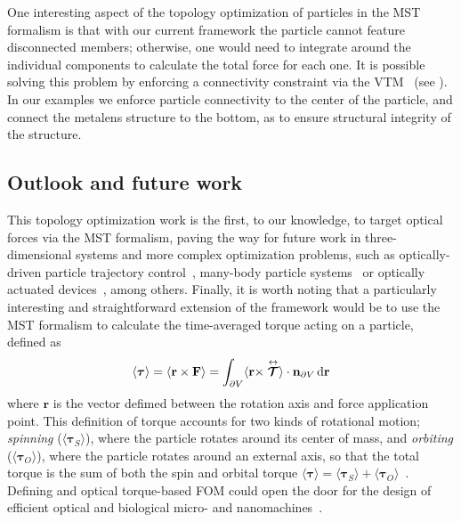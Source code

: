 One interesting aspect of the topology optimization of particles in the MST formalism is that with our current framework the particle cannot feature disconnected members; otherwise,
one would need to integrate around the individual components to calculate the total force for each one. It is possible solving this problem by enforcing 
a connectivity constraint via the VTM~\cite{li_structural_2016} (see ). In our examples
we enforce particle connectivity to the center of the particle, and connect the metalens structure to the bottom, as to ensure structural
integrity of the structure.

\subsection*{Outlook and future work}

This topology optimization work is the first, to our knowledge, to 
target optical forces via the MST formalism, paving the way for future work in three-dimensional systems and more complex optimization problems, such as optically-driven particle
trajectory control~\cite{zemanek_perspective_2019, macdonald_microfluidic_2003, shilkin_directional_2017}, many-body particle systems~\cite{bechinger_active_2016, chang_colloquium_2018} or optically actuated devices~\cite{ivanyi_optically_2024}, among others.
Finally, it is worth noting that a particularly interesting and straightforward extension of the framework would be to use the MST formalism to calculate the time-averaged torque acting on a particle, defined as~\cite{novotny}
\begin{equation}
    \langle \bm{\tau} \rangle = \langle \mathbf{r} \times \mathbf{F} \rangle = \int_{\partial V} \langle \mathbf{r}
     \times \stackrel{\leftrightarrow}{\bm{\mathcal{T}}} \rangle \cdot \mathbf{n}_{\partial V} \mathop{}\!\text{d}\mathbf{r} 
\end{equation}
where $\mathbf{r}$ is the vector defimed between the rotation axis and force application point. This definition of torque accounts
for two kinds of rotational motion; \textit{spinning} ($\langle \bm{\tau}_S \rangle$), where the particle rotates around its center of mass,
and \textit{orbiting} ($\langle \bm{\tau}_O \rangle$), where the particle rotates around an external axis, so that the total torque is the sum
of both the spin and orbital torque $\langle \bm{\tau} \rangle = \langle \bm{\tau}_S \rangle + \langle \bm{\tau}_O \rangle$~\cite{torque}.  Defining
and optical torque-based FOM could open the door for the design of efficient optical and biological micro- and nanomachines~\cite{rotating, gluck}.


